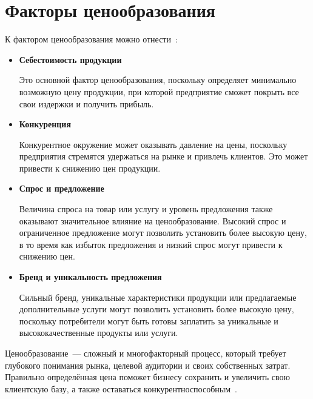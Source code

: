\section{Факторы ценообразования}
К фактором ценообразования можно отнести~\cite{cost1}:
\begin{itemize}
	\item \textbf{Себестоимость продукции}
	
	Это основной фактор ценообразования, поскольку определяет минимально возможную цену продукции, при которой предприятие сможет покрыть все свои издержки и получить прибыль.
	\item \textbf{Конкуренция}
	
	Конкурентное окружение может оказывать давление на цены, поскольку предприятия стремятся удержаться на рынке и привлечь клиентов. 
	Это может привести к снижению цен продукции.
	
	\item\textbf{Спрос и предложение}
	
	Величина спроса на товар или услугу и уровень предложения также оказывают значительное влияние на ценообразование. 
	Высокий спрос и ограниченное предложение могут позволить установить более высокую цену, в то время как избыток предложения и низкий спрос могут привести к снижению цен.
	\item\textbf{Бренд и уникальность предложения}
	
	Сильный бренд, уникальные характеристики продукции или предлагаемые дополнительные услуги могут позволить установить более высокую цену, поскольку потребители могут быть готовы заплатить за уникальные и высококачественные продукты или услуги.
\end{itemize}
		
Ценообразование~--- сложный и многофакторный процесс, который требует глубокого понимания рынка, целевой аудитории и своих собственных затрат. 
Правильно определённая цена поможет бизнесу сохранить и увеличить свою клиентскую базу, а также оставаться конкурентноспособным~\cite{cost2}.
		
		
